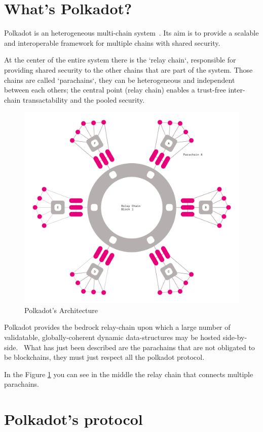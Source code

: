\section{What's Polkadot?}

Polkadot is an heterogeneous multi-chain system~\cite{wood2016polkadot}. Its aim is to provide a scalable and interoperable framework for multiple chains with shared security.~\cite{burdges2020overview}

At the center of the entire system there is the `relay chain`, responsible for providing shared security to the other chains that are part of the system. Those chains are called `parachains`, they can be heterogeneous and independent between each others; the central point (relay chain) enables a trust-free inter-chain transactability and the pooled security.~\cite{burdges2020overview}

\begin{figure}[h]
  \centering
  \includegraphics[width=0.7\linewidth]{polkadot_architecture.png}
  \caption{Polkadot's Architecture}
  \label{fig:polkadot_arch}
\end{figure}

Polkadot provides the bedrock relay-chain upon which a large number of validatable, globally-coherent dynamic data-structures may be hosted side-by-side.~\cite{wood2016polkadot} What has just been described are the parachains that are not obligated to be blockchains, they  must just respect all the polkadot protocol.

In the Figure \ref{fig:polkadot_arch} you can see in the middle the relay chain that connects multiple parachains.

\section{Polkadot's protocol}

